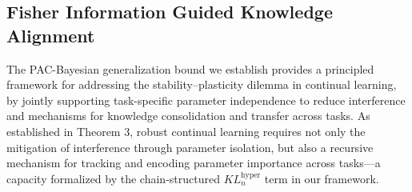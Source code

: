 \documentclass[letterpaper]{article} %
\begin{document}
\subsection{Fisher Information Guided Knowledge Alignment}







The PAC-Bayesian generalization bound we establish provides a principled framework for addressing the stability–plasticity dilemma in continual learning, by jointly supporting task-specific parameter independence to reduce interference and mechanisms for knowledge consolidation and transfer across tasks. As established in Theorem 3, robust continual learning requires not only the mitigation of interference through parameter isolation, but also a recursive mechanism for tracking and encoding parameter importance across tasks—a capacity formalized by the chain-structured $KL^{\text{hyper}}_n$ term in our framework.
\end{document}
